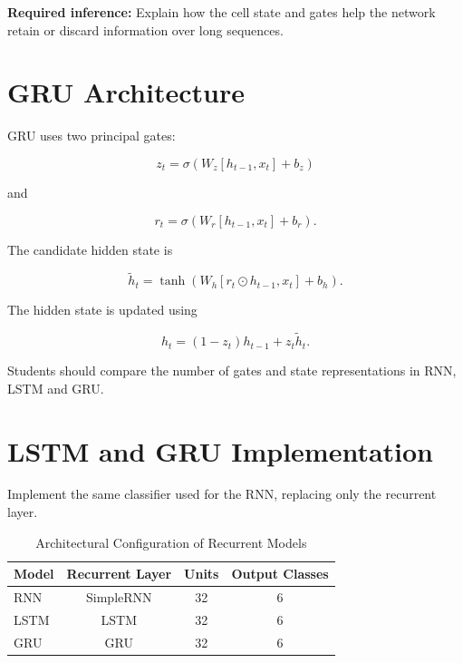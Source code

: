 \documentclass[10pt]{article}
\begin{document}
\textbf{Required inference:} Explain how the cell state and gates help the
network retain or discard information over long sequences.

\section{GRU Architecture}

GRU uses two principal gates:

\[
z_t=\sigma(W_z[h_{t-1},x_t]+b_z)
\]

and

\[
r_t=\sigma(W_r[h_{t-1},x_t]+b_r).
\]

The candidate hidden state is

\[
\tilde{h}_t=
\tanh(W_h[r_t\odot h_{t-1},x_t]+b_h).
\]

The hidden state is updated using

\[
h_t=(1-z_t)h_{t-1}+z_t\tilde{h}_t.
\]

\begin{center}
\end{center}

Students should compare the number of gates and state representations in
RNN, LSTM and GRU.

\section{LSTM and GRU Implementation}

Implement the same classifier used for the RNN, replacing only the recurrent
layer.

\begin{table}[H]
\centering
\begin{tabular}{|l|c|c|c|}
\hline
Model & Recurrent Layer & Units & Output Classes\\
\hline
RNN & SimpleRNN & 32 & 6\\
LSTM & LSTM & 32 & 6\\
GRU & GRU & 32 & 6\\
\hline
\end{tabular}
\caption{Architectural Configuration of Recurrent Models}
\label{tab:recurrent_models_config}
\end{table}
\end{document}
